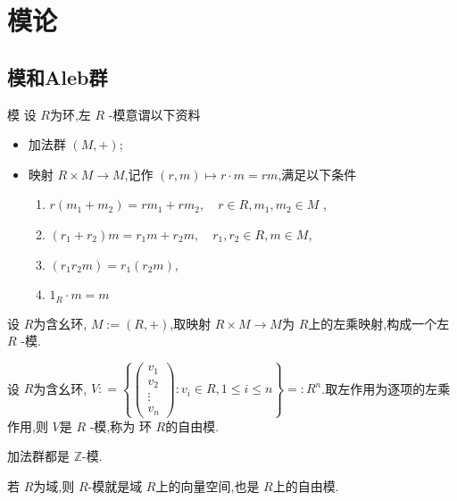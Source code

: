 \documentclass[lang=cn,12pt,color=green,fontset=none,pad]{elegantbook}
\begin{document}
\part{模论}
\chapter{模和Aleb群}

\begin{definition}{模}
    设 $ R $为环,左 $ R $ -模意谓以下资料
    \begin{itemize}
        \item 加法群 $ \left( M,+  \right)  $;
        \item 映射 $ R\times M\to M $,记作 $ \left( r,m \right) \mapsto r \cdot  m= rm  $,满足以下条件
        \begin{enumerate}
            \item $ r\left( m_1+ m_2 \right)=rm_1+ rm_2,\quad r \in  R, m_1,m_2\in M  $ ,
            \item $ \left( r_1+ r_2 \right)m  = r_1m+ r_2m,\quad r_1,r_2\in R,m \in M$,
            \item $ \left( r_1r_2m \right)=r_1\left( r_2m \right)   $,
            \item $ 1_{R}\cdot m=m $   
        \end{enumerate}
           
    \end{itemize} 
\end{definition}
\begin{example}
    设 $  R $为含幺环, $M:= \left( R,+  \right)  $,取映射 $ R\times M\to M $为 $ R $上的左乘映射,构成一个左 $ R $ -模.     
\end{example}

\begin{example}
    设 $ R $为含幺环, $ V: = \left\{  \begin{pmatrix} 
        v_1\\ 
         v_2\\ 
          \vdots\\ 
           v_{n} 
    \end{pmatrix}  :  v_{i} \in  R ,1 \le i \le n\right\}  = :R^{n}$.取左作用为逐项的左乘作用,则 $ V $是 $ R $ -模,称为 环 $ R $的自由模.   
\end{example}

\begin{example}
    加法群都是 $ \mathbb{Z}      $-模. 
\end{example}
\begin{example}
    若 $ R $为域,则 $ R $-模就是域 $ R $上的向量空间,也是 $ R $上的自由模.    
           
\end{example}
\end{document}
